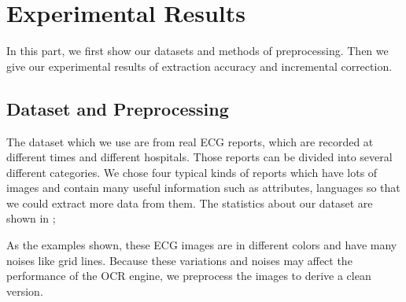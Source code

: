 \section{Experimental Results}
\label{sec:eval}
In this part, we first show our datasets and methods of preprocessing. Then we give our experimental results of extraction accuracy and incremental correction.

\subsection{Dataset and Preprocessing}
The dataset which we use are from real ECG reports, which are recorded at different times and different hospitals. Those reports can be divided into several different categories. We chose four typical kinds of reports which have lots of images and contain many useful information such as attributes, languages so that we could extract more data from them.
The statistics about our dataset are 
shown in ; 




As the examples shown, these ECG images are in different colors 
and have many noises like grid lines. 
Because these variations and noises
may affect the performance of the OCR engine, 
we preprocess the images to derive a clean version. 

